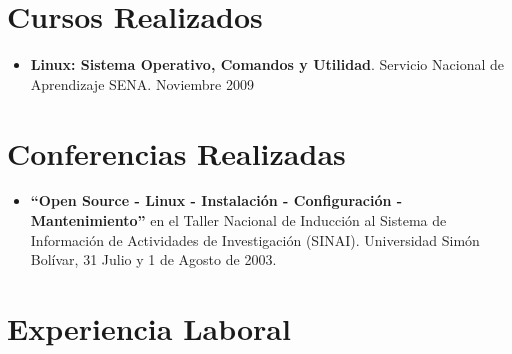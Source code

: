 \documentclass[letterpaper,11pt]{report}
\begin{document}
\section*{Cursos Realizados}
\begin{itemize}
\item \textbf{Linux: Sistema Operativo, Comandos y Utilidad}. Servicio Nacional de Aprendizaje SENA. Noviembre 2009
\end{itemize}

\section*{Conferencias Realizadas}
\begin{itemize}
\item
\textbf{``Open Source - Linux - Instalación - Configuración - Mantenimiento''} en el Taller Nacional de Inducción al Sistema de Información de Actividades de Investigación (SINAI). Universidad Simón Bolívar, 31 Julio y 1 de Agosto de 2003.
\end{itemize}

\newpage
\section*{Experiencia Laboral}
\end{document}
